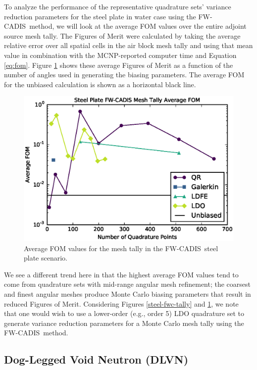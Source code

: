 \documentclass{article} %
\newcommand{\fwc}{\mbox{FW-CADIS}}
\begin{document}
To analyze the performance of the representative quadrature sets' variance
reduction parameters for the steel plate in water case using the \fwc\ method,
we will look at the average FOM values over the entire adjoint source mesh
tally. The Figures of Merit were calculated by taking the average relative
error over all spatial cells in the air block mesh tally and using that mean
value in combination with the MCNP-reported computer time and Equation
\eqref{eq:fom}. Figure \ref{steel-fwc-fom} shows these average Figures of Merit
as a function of the number of angles used in generating the biasing
parameters. The average FOM for the unbiased calculation is shown as a
horizontal black line.

\begin{figure}[!htb]
\centering
\includegraphics[max height=0.445\textheight]{img/steel-fwcadis-fom.eps}
\caption{Average FOM values for the mesh tally in the \fwc\ steel plate scenario.}
\label{steel-fwc-fom}
\end{figure}

We see a different trend here in that the highest average FOM values tend to
come from quadrature sets with mid-range angular mesh refinement; the coarsest
and finest angular meshes produce Monte Carlo biasing parameters that result
in reduced Figures of Merit. Considering Figures \ref{steel-fwc-tally} and
\ref{steel-fwc-fom}, we note that one would wish to use a lower-order (e.g.,
order 5) LDO quadrature set to generate variance reduction parameters for a
Monte Carlo mesh tally using the \fwc\ method.

\FloatBarrier
\subsection{Dog-Legged Void Neutron (DLVN)}
\end{document}
